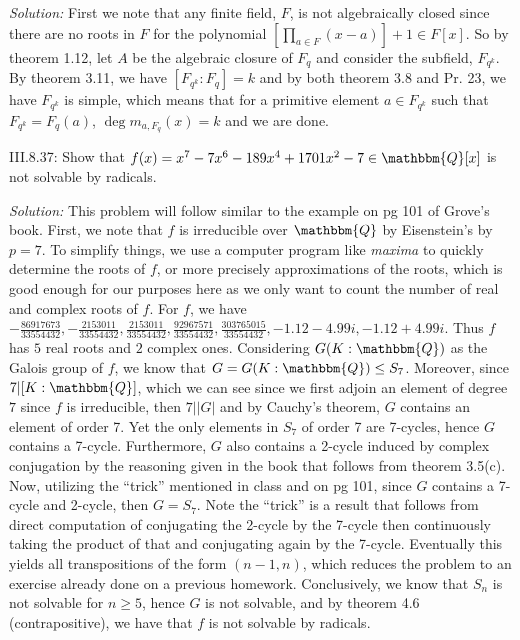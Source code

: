 \documentclass{letter}
\newcommand{\tmem}[1]{{\em #1\/}}
\begin{document}
{\tmem{Solution:}} First we note that any finite field, $F$, is not
algebraically closed since there are no roots in $F$ for the polynomial $[
\prod_{a \in F} (x - a)] + 1 \in F [x]$. So by theorem 1.12, let $A$ be the
algebraic closure of $F_q$ and consider the subfield, $F_{q^k}$. By theorem
3.11, we have $[F_{q^k} : F_q] = k$ and by both theorem 3.8 and Pr. 23, we
have $F_{q^k}$ is simple, which means that for a primitive element $a \in
F_{q^k}$ such that $F_{q^k} = F_q (a)$, $\deg m_{a, F_q} (x) = k$ and we are
done.

III.8.37: Show that $f (x) = x^7 - 7 x^6 - 189 x^4 + 1701 x^2 - 7 \in
\mathbbm{Q}[x]$ is not solvable by radicals.

{\tmem{Solution:}} This problem will follow similar to the example on pg 101
of Grove's book. First, we note that $f$ is irreducible over $\mathbbm{Q}$ by
Eisenstein's by $p = 7$. To simplify things, we use a computer program like
{\tmem{maxima}} to quickly determine the roots of $f$, or more precisely
approximations of the roots, which is good enough for our purposes here as we
only want to count the number of real and complex roots of $f$. For $f$, we
have $- \frac{86917673}{33554432}, - \frac{2153011}{33554432},
\frac{2153011}{33554432}, \frac{92967571}{33554432},
\frac{303765015}{33554432}, - 1.12 - 4.99 i, - 1.12 + 4.99 i$. Thus $f$ has
$5$ real roots and $2$ complex ones. Considering $G (K : \mathbbm{Q})$ as the
Galois group of $f$, we know that $G = G (K : \mathbbm{Q}) \leq S_7$.
Moreover, since $7 | [K : \mathbbm{Q}]$, which we can see since we first
adjoin an element of degree $7$ since $f$ is irreducible, then $7 | |G|$ and
by Cauchy's theorem, $G$ contains an element of order 7. Yet the only elements
in $S_7$ of order 7 are 7-cycles, hence $G$ contains a 7-cycle. Furthermore,
$G$ also contains a 2-cycle induced by complex conjugation by the reasoning
given in the book that follows from theorem 3.5(c). Now, utilizing the
``trick'' mentioned in class and on pg 101, since $G$ contains a 7-cycle and
2-cycle, then $G = S_7$. Note the ``trick'' is a result that follows from
direct computation of conjugating the 2-cycle by the 7-cycle then continuously
taking the product of that and conjugating again by the 7-cycle. Eventually
this yields all transpositions of the form $(n - 1, n)$, which reduces the
problem to an exercise already done on a previous homework. Conclusively, we
know that $S_n$ is not solvable for $n \geq 5$, hence $G$ is not solvable, and
by theorem 4.6 (contrapositive), we have that $f$ is not solvable by radicals.
\end{document}
